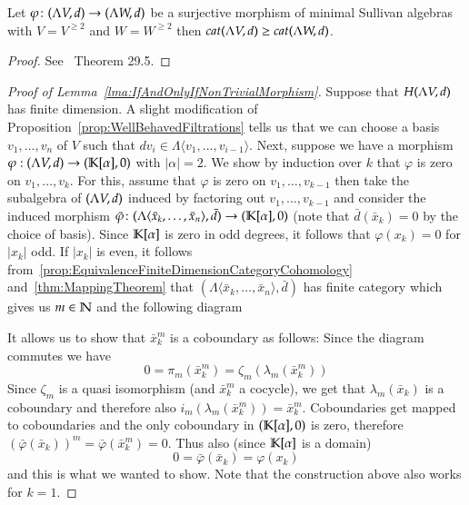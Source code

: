   \begin{Theorem}
\label{thm:MappingTheorem}
   Let $\varphi \colon (\Lambda V,d) \to (\Lambda W,d)$ be a surjective morphism of minimal Sullivan algebras with $V = V^{\geq 2}$
   and $W = W^{\geq 2}$ then $cat (\Lambda V,d) \geq cat(\Lambda W,d)$.
  \end{Theorem}
  \begin{proof}
   See~\cite{Felix2001} Theorem 29.5.
  \end{proof}

  
  
 \begin{proof}[Proof of Lemma~\ref{lma:IfAndOnlyIfNonTrivialMorphism}]
 
  
  Suppose that $H(\Lambda V,d)$ has finite dimension. A slight modification of Proposition~\ref{prop:WellBehavedFiltrations} tells us that we can 
  choose a basis $v_1, \ldots , v_n$ of $V$ such that $d v_i \in \Lambda \langle v_1, \ldots, v_{i-1} \rangle$.
  Next, suppose we have a morphism  $ \varphi : (\Lambda V,d) \to (\mathbb{K}[\alpha],0)$ with  $|\alpha| = 2 $. We show by induction over $k$ that
  $\varphi$ is zero on $v_1 , \ldots, v_k$.
  For this, assume that $\varphi$ is zero on $v_1, \ldots, v_{k-1}$ then take the
  subalgebra of $(\Lambda V,d)$ induced by factoring out $v_1, \ldots, v_{k-1}$ and consider the induced morphism 
  $\bar{\varphi} \colon (\Lambda \langle \bar{x}_k, \ldots, \bar{x}_n \rangle , \bar{d}) \to (\mathbb{K}[\alpha],0) $
  (note that $\bar{d}(\bar{x}_k) = 0$ by the  choice of basis). Since $\mathbb{K}[\alpha]$ is zero in odd degrees,
  it follows that $\varphi(x_k) = 0$ for $|x_k|$ odd. If $|x_k|$ is even,
  it follows from~\ref{prop:EquivalenceFiniteDimensionCategoryCohomology} and~\ref{thm:MappingTheorem} 
  that $(\Lambda \langle \bar{x}_k, \ldots, \bar{x}_n \rangle , \bar{d})$ has finite category which gives us  $m \in \mathbb{N}$ and the
  following diagram
  
  \centerline{
  }
  It allows us to show that $\bar{x}_k^m$ is a coboundary as follows:
  Since the diagram commutes we have
  $$0 = \pi_m(\bar{x}_k^m) =   \zeta_m (\lambda_m (\bar{x}_k^m))$$ 
   Since $\zeta_m$ is a quasi isomorphism (and $\bar{x}_k^m$ a cocycle), we get that $\lambda_m (\bar{x}_k)$ is a coboundary and
  therefore also $ i_m (\lambda_m (\bar{x}_k^m)) = \bar{x}_k^m$. Coboundaries get mapped to coboundaries and the only coboundary
  in $(\mathbb{K}[\alpha], 0)$ is zero, therefore 
  $(\bar{\varphi}(\bar{x}_k))^m = \bar{\varphi}(\bar{x}_k^m) = 0$. Thus also (since $\mathbb{K}[\alpha]$ is a domain)
  $$ 0 = \bar{\varphi}(\bar{x}_k) = \varphi( x_k)$$
  and this is what we wanted to show. Note that the construction above also works for $k = 1$.
  

\end{proof}
